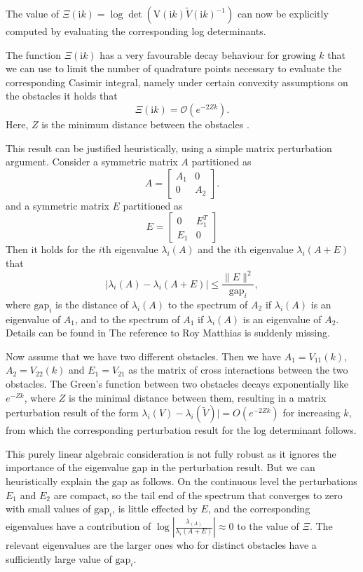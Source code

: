 The value of $\Xi(\mathrm{i}k) = \log\det(\mathrm{V}(\mathrm{i}k)\tilde{V}(\mathrm{i}k)^{-1})$ can now be explicitly computed by evaluating the corresponding log determinants.

The function $\Xi(\mathrm{i}k)$ has a very favourable decay behaviour for growing $k$ that we can use to limit the number of quadrature points necessary to evaluate the corresponding Casimir integral, namely under certain convexity assumptions on the obstacles it holds that
$$
\Xi(\mathrm{i}k) = \mathcal{O}(e^{-2Zk}).
$$
Here, $Z$ is the minimum distance between the obstacles  \cite[Theorem 4.1]{fang2022trace}.

This result can be justified heuristically, using a simple matrix perturbation argument. Consider a symmetric matrix $A$ partitioned as
$$
A = \begin{bmatrix}A_1 & 0\\
                              0   & A_2
       \end{bmatrix}.
$$
and a symmetric matrix $E$ partitioned as
$$
E= \begin{bmatrix}0 & E_1^T\\
     E_1 & 0
     \end{bmatrix}
$$
Then it holds for the $i$th eigenvalue $\lambda_i(A)$ and the $i$th eigenvalue $\lambda_i(A+E)$ that
$$
|\lambda_i(A) - \lambda_i(A+E)| \leq \frac{\|E\|^2}{\text{gap}_i},
$$
where $\text{gap}_i$ is the distance of $\lambda_i(A)$ to the spectrum of $A_2$ if $\lambda_i(A)$ is an eigenvalue of $A_1$, and to the spectrum of $A_1$ if $\lambda_i(A)$ is an eigenvalue of $A_2$. Details can be found in  \cite{nakatsukasa2015off} {\color{red} The reference to Roy Matthias is suddenly missing}.

Now assume that we have two different obstacles. Then we have $A_1 = V_{11}(k)$, $A_2 = V_{22}(k)$ and $E_1 = V_{21}$ as the matrix of cross interactions between the two obstacles. The Green's function between two obstacles decays exponentially like $e^{-Zk}$, where $Z$ is the minimal distance between them, resulting in a matrix perturbation result of the form $\lambda_i(V) - \lambda_i(\tilde{V})| = O(e^{-2Zk})$ for increasing $k$, from which the corresponding perturbation result for the log determinant follows.

This purely linear algebraic consideration is not fully robust as it ignores the importance of the eigenvalue gap in the perturbation result. But we can heuristically explain the $\text{gap}$ as follows. On the continuous level the perturbations $E_1$ and $E_2$ are compact, so the tail end of the spectrum that converges to zero with small values of $\text{gap}_i$, is little effected by $E$, and the corresponding eigenvalues have a contribution of $\log \left|\frac{\lambda_(A)}{\lambda_i(A+E)}\right| \approx 0$ to the value of $\Xi$. The relevant eigenvalues are the larger ones who for distinct obstacles have a sufficiently large value of $\text{gap}_i$.

